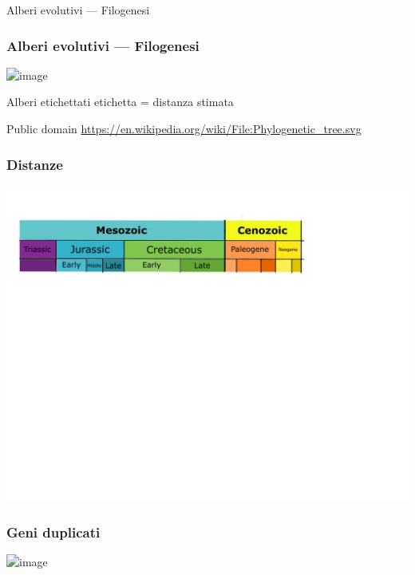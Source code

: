 


\begin{frame}
	\titlepage

	\centering
	Alberi evolutivi --- Filogenesi
\end{frame}



\begin{frame}
	\frametitle{Alberi evolutivi --- Filogenesi}

	\centering
	\includegraphics<1>[height=0.55\textheight]{figures/Phylogenetic_tree_legend}

	\begin{block}{Alberi etichettati}
		etichetta = distanza stimata
	\end{block}

	\vfill\small
	Public domain \url{https://en.wikipedia.org/wiki/File:Phylogenetic_tree.svg}
\end{frame}

\begin{frame}
	\frametitle{Distanze}
	\centering
	\includegraphics[height=0.95\textheight]{figures/Phylogenetic_chart_of_Lepidoptera_chronogram}
\end{frame}

\begin{frame}
	\frametitle{Geni duplicati}
	\centering
	\includegraphics<1>[width=0.7\textwidth]{figures/Evolution_fate_duplicate_genes}
\end{frame}

